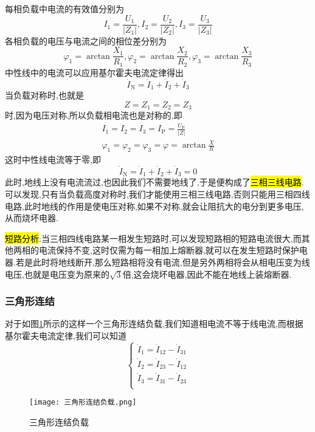 每相负载中电流的有效值分别为
\begin{equation}
    I_1=\frac{U_1}{\left| Z_1 \right|},I_2=\frac{U_2}{\left| Z_2 \right|},I_3=\frac{U_3}{\left| Z_3 \right|}
\end{equation}
各相负载的电压与电流之间的相位差分别为
\begin{equation}
    \varphi _1=\arctan \frac{X_1}{R_1},\varphi _2=\arctan \frac{X_2}{R_2},\varphi _3=\arctan \frac{X_3}{R_3}
\end{equation}
中性线中的电流可以应用基尔霍夫电流定律得出
\begin{equation}
    \dot{I}_{\mathrm{N}}=\dot{I}_1+\dot{I}_2+\dot{I}_3
\end{equation}
当负载对称时,也就是
\begin{equation}
    Z=Z_1=Z_2=Z_3
\end{equation}
时,因为电压对称,所以负载相电流也是对称的,即
\begin{equation}
    \begin{gathered}
        I_1=I_2=I_3=I_{\mathrm{P}}=\frac{U_{\mathrm{P}}}{|Z|} \\
        \varphi_1=\varphi_2=\varphi_3=\varphi=\arctan \frac{X}{R}
    \end{gathered}
\end{equation}
这时中性线电流等于零,即
\begin{equation}
    \dot{I}_{\mathrm{N}}=\dot{I}_1+\dot{I}_2+\dot{I}_3=0
\end{equation}
此时,地线上没有电流流过,也因此我们不需要地线了,于是便构成了\hl{三相三线电路}.可以发现,只有当负载高度对称时,我们才能使用三相三线电路,否则只能用三相四线电路,此时地线的作用是使电压对称,如果不对称,就会让阻抗大的电分到更多电压,从而烧坏电器.

\Par \hl{短路分析}:当三相四线电路某一相发生短路时,可以发现短路相的短路电流很大,而其他两相的电流保持不变,这时仅需为每一相加上熔断器,就可以在发生短路时保护电器.若是此时将地线断开,那么短路相将没有电流,但是另外两相将会从相电压变为线电压,也就是电压变为原来的$\sqrt{3}$倍,这会烧坏电器,因此不能在地线上装熔断器.

\subsubsection{\K 三角形连结}

\Par 对于如图\ref{fig:三角形连结负载}所示的这样一个三角形连结负载,我们知道相电流不等于线电流,而根据基尔霍夫电流定律,我们可以知道
\begin{equation}
    \left\{ \begin{array}{l}
        \dot{I}_1=\dot{I}_{12}-\dot{I}_{31}\\
        \dot{I}_2=\dot{I}_{23}-\dot{I}_{12}\\
        \dot{I}_3=\dot{I}_{31}-\dot{I}_{23}\\
    \end{array} \right. 
\end{equation}
\begin{figure}[htbp]
	\centering
	\texttt{[image: 三角形连结负载.png]}
	\caption{三角形连结负载}
	\label{fig:三角形连结负载}
\end{figure}

